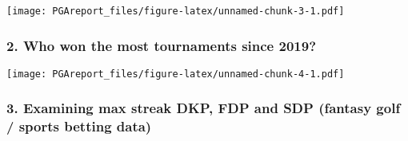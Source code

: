 \documentclass[
]{article}
\newenvironment{Shaded}{\begin{snugshade}}{\end{snugshade}}
\newcommand{\DataTypeTok}[1]{\textcolor[rgb]{0.13,0.29,0.53}{#1}}
\newcommand{\DecValTok}[1]{\textcolor[rgb]{0.00,0.00,0.81}{#1}}
\newcommand{\KeywordTok}[1]{\textcolor[rgb]{0.13,0.29,0.53}{\textbf{#1}}}
\newcommand{\NormalTok}[1]{#1}
\newcommand{\OperatorTok}[1]{\textcolor[rgb]{0.81,0.36,0.00}{\textbf{#1}}}
\newcommand{\StringTok}[1]{\textcolor[rgb]{0.31,0.60,0.02}{#1}}
\begin{document}
\texttt{[image: PGAreport\_files/figure-latex/unnamed-chunk-3-1.pdf]}

\hypertarget{who-won-the-most-tournaments-since-2019}{%
\subsubsection{2. Who won the most tournaments since
2019?}\label{who-won-the-most-tournaments-since-2019}}

\begin{Shaded}
\end{Shaded}

\texttt{[image: PGAreport\_files/figure-latex/unnamed-chunk-4-1.pdf]}

\hypertarget{examining-max-streak-dkp-fdp-and-sdp-fantasy-golf-sports-betting-data}{%
\subsubsection{3. Examining max streak DKP, FDP and SDP (fantasy golf /
sports betting
data)}\label{examining-max-streak-dkp-fdp-and-sdp-fantasy-golf-sports-betting-data}}
\end{document}
